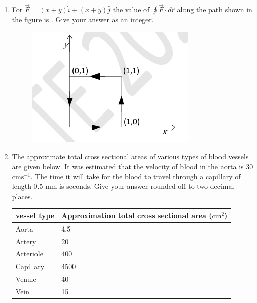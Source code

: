 \documentclass[a4paper,12pt]{exam}
\numberwithin{equation}{enumi}
\numberwithin{figure}{enumi}
\begin{document}
\begin{enumerate}
\item For $\vec{F} = (x + y)\hat{i} + (x + y)\hat{j}$ the value of $\oint\vec{F}\cdot d\hat{r}$ along the path shown in the figure is \underline{\hspace{0.75cm}}. Give your answer as an integer. 

\hfill{}

\begin{figure}[H]
\centering
\includegraphics[width=0.5\columnwidth]{figs/Q50.png}
\label{fig:50.png}
\end{figure}

\item The approximate total cross sectional areas of various types of blood vessels are given below. It was estimated that the velocity of blood in the aorta is 30 $\text{cms}^{-1}$. The time it 
will take for the blood to travel through a capillary of length 0.5 mm is \underline{\hspace{0.75cm}} seconds. Give your answer rounded off to two decimal places.  


\begin{table}[H]
\def\arraystretch{1.5}
\centering
\begin{tabular}{|m{4cm}|m{4cm}|}
\hline
\hspace{0.75cm}vessel type & Approximation total cross sectional area ($\text{cm}^2$)\\ \hline
\hspace{1cm}Aorta&\hspace{1cm}4.5 \\ \hline
\hspace{1cm}Artery&\hspace{1cm}20 \\ \hline
\hspace{1cm}Arteriole&\hspace{1cm}400 \\ \hline
\hspace{1cm}Capillary&\hspace{1cm}4500 \\ \hline
\hspace{1cm}Venule&\hspace{1cm}40 \\ \hline
\hspace{1cm}Vein&\hspace{1cm}15 \\ \hline
\end{tabular}
\end{table}


\end{enumerate}
\end{document}
